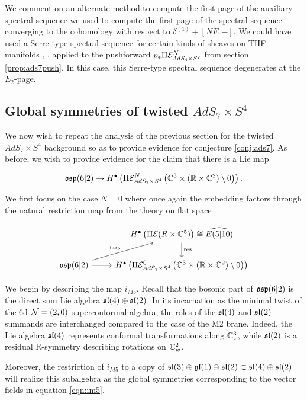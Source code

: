 \begin{rmk}\label{rmk:altss}
We comment on an alternate method to compute the first page of the auxiliary spectral sequence we used to compute the first page of the spectral sequence converging to the cohomology with respect to $\delta^{(1)} + [NF, - ]$. We could have used a Serre-type spectral sequence for certain kinds of sheaves on THF manifolds \cite{KamberTondeur}, \cite{KormanThesis}, applied to the pushforward $ p_* \Pi \mathcal{E}^N_{AdS_4\times S^7}$ from section \ref{prop:ads7push}. In this case, this Serre-type spectral sequence degenerates at the $E_2$-page.
\end{rmk}

\subsection{Global symmetries of twisted $AdS_7 \times S^4$}
We now wish to repeat the analysis of the previous section for the twisted $AdS_7\times S^4$ background so as to provide evidence for conjecture \ref{conj:ads7}. As before, we wish to provide evidence for the claim that there is a Lie map 

\[\mathfrak{osp}(6|2)\to H^\bullet \left ( \Pi \mathcal{E}^N_{AdS_7\times S^4} \left ( \mathbb{C}^3 \times (\mathbb{R}\times \mathbb{C}^2)\setminus 0 \right ) \right ).\]

We first focus on the case $N=0$ where once again the embedding factors through the natural restriction map from the theory on flat space

\[ 
\begin{tikzcd}
& H^\bullet \left ( \Pi \mc E (R\times \C^5)\right )\cong\widehat{E(5|10) }\ar[d, "\mr{res}"] \\
\mf{osp}(6|2)\ar[ur, "i_{M5}"]\ar[r] & H^\bullet \left ( \Pi \mc E^0_{AdS_7\times S^4} \left ( \C^3 \times (\R\times \C^2)\setminus 0 \right ) \right )
\end{tikzcd}
\]

\parsec[s:m5embedding]
We begin by describing the map $i_{M5}$. Recall that the bosonic part of $\mathfrak{osp}(6|2)$ is the direct sum Lie algebra $\mathfrak{sl}(4) \oplus \mathfrak{sl}(2)$. In its incarnation as the minimal twist of the 6d $\mathcal{N}=(2,0)$ superconformal algebra,  the roles of the $\mathfrak{sl}(4)$ and $\mathfrak{sl}(2)$ summands are interchanged compared to the case of the M2 brane. Indeed, the Lie algebra $\mathfrak{sl}(4)$ represents conformal transformations along $\mathbb{C}^3_z$, while $\mathfrak{sl}(2)$ is a residual R-symmetry describing rotations on $\mathbb{C}^2_w$.

Moreover, the restriction of $i_{M5}$ to a copy of $\mathfrak{sl}(3)\oplus\mathfrak{gl}(1)\oplus \mathfrak{sl}(2)\subset \mathfrak{sl}(4) \oplus \mathfrak{sl}(2)$ will realize this subalgebra as the global symmetries corresponding to the vector fields in equation \ref{eqn:im5}. 

